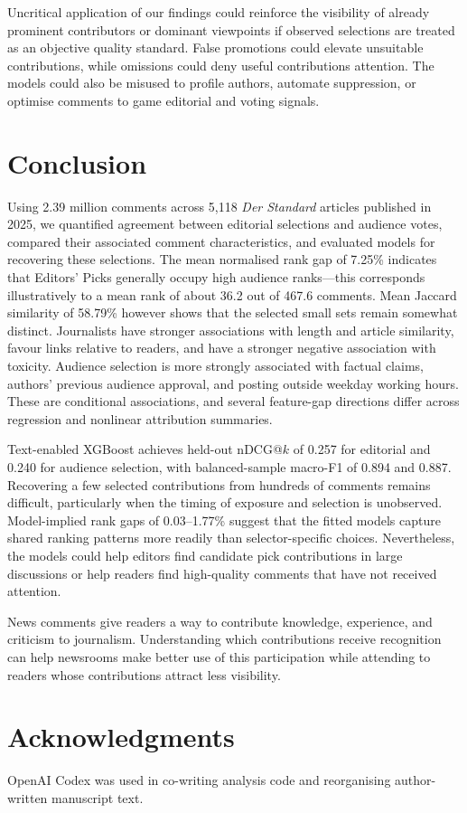 Uncritical application of our findings could reinforce the visibility of already prominent contributors or dominant viewpoints if observed selections are treated as an objective quality standard. False promotions could elevate unsuitable contributions, while omissions could deny useful contributions attention. The models could also be misused to profile authors, automate suppression, or optimise comments to game editorial and voting signals.

\section{Conclusion}
Using 2.39 million comments across 5,118 \textit{Der Standard} articles published in 2025, we quantified agreement between editorial selections and audience votes, compared their associated comment characteristics, and evaluated models for recovering these selections. The mean normalised rank gap of 7.25\% indicates that Editors' Picks generally occupy high audience ranks---this corresponds illustratively to a mean rank of about 36.2 out of 467.6 comments. Mean Jaccard similarity of 58.79\% however shows that the selected small sets remain somewhat distinct. Journalists have stronger associations with length and article similarity, favour links relative to readers, and have a stronger negative association with toxicity. Audience selection is more strongly associated with factual claims, authors' previous audience approval, and posting outside weekday working hours. These are conditional associations, and several feature-gap directions differ across regression and nonlinear attribution summaries.

Text-enabled XGBoost achieves held-out nDCG@$k$ of 0.257 for editorial and 0.240 for audience selection, with balanced-sample macro-F1 of 0.894 and 0.887. Recovering a few selected contributions from hundreds of comments remains difficult, particularly when the timing of exposure and selection is unobserved. Model-implied rank gaps of 0.03--1.77\% suggest that the fitted models capture shared ranking patterns more readily than selector-specific choices. Nevertheless, the models could help editors find candidate pick contributions in large discussions or help readers find high-quality comments that have not received attention.

News comments give readers a way to contribute knowledge, experience, and criticism to journalism. Understanding which contributions receive recognition can help newsrooms make better use of this participation while attending to readers whose contributions attract less visibility.

\section*{Acknowledgments}
OpenAI Codex was used in co-writing analysis code and reorganising author-written manuscript text.
